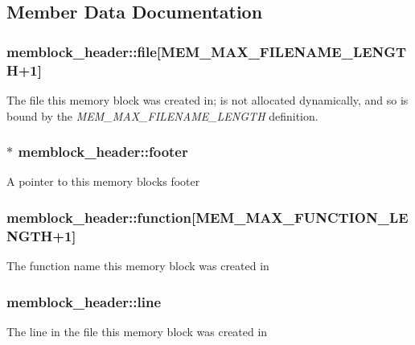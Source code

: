 \subsection{Member Data Documentation}
\subsubsection[{file}]{ memblock\-\_\-header\-::file\mbox{[}{\bf M\-E\-M\-\_\-\-M\-A\-X\-\_\-\-F\-I\-L\-E\-N\-A\-M\-E\-\_\-\-L\-E\-N\-G\-T\-H}+1\mbox{]}}\label{structmemblock__header_aafc71ef9dade058f65a814a1b2e3ffd2}
The file this memory block was created in; is not allocated dynamically, and so is bound by the {\itshape M\-E\-M\-\_\-\-M\-A\-X\-\_\-\-F\-I\-L\-E\-N\-A\-M\-E\-\_\-\-L\-E\-N\-G\-T\-H} definition. 
\subsubsection[{footer}]{$\ast$ memblock\-\_\-header\-::footer}\label{structmemblock__header_ab9999ece91b34ae2742865b27791b374}
A pointer to this memory blocks footer 
\subsubsection[{function}]{ memblock\-\_\-header\-::function\mbox{[}{\bf M\-E\-M\-\_\-\-M\-A\-X\-\_\-\-F\-U\-N\-C\-T\-I\-O\-N\-\_\-\-L\-E\-N\-G\-T\-H}+1\mbox{]}}\label{structmemblock__header_acd1e57226698ef61dc9ffb3a55dcd7e2}
The function name this memory block was created in 
\subsubsection[{line}]{ memblock\-\_\-header\-::line}\label{structmemblock__header_a4d7851e5d73d69d982776d281c222b1d}
The line in the file this memory block was created in 
